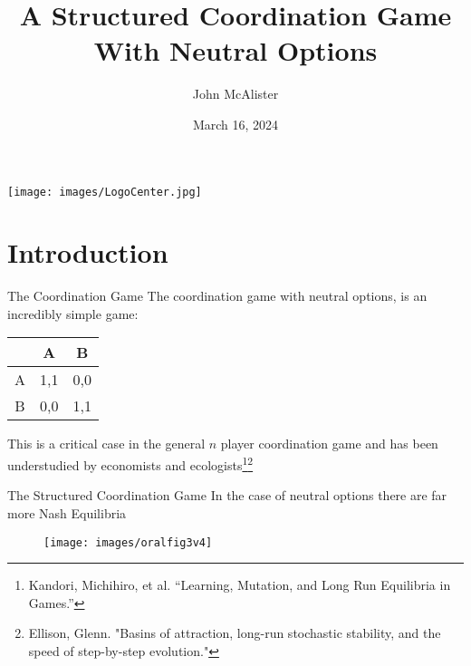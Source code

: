 \documentclass{beamer}
\title{A Structured Coordination Game With Neutral Options}
\author{John McAlister}
\institute[Fefferman Lab]{University of Tennessee - Knoxville}
\date{March 16, 2024}
\begin{document}
\begin{frame}[plain]
    \centering
    \maketitle
    \texttt{[image: images/LogoCenter.jpg]}
\end{frame}
\section{Introduction}
\begin{frame}{The Coordination Game}
	The coordination game with neutral options, is an incredibly simple game:
	\begin{center} 
		\begin{tabular}{c|cc}
			&A&B\\
			\hline 
			A&1,1&0,0\\
			B&0,0&1,1
		\end{tabular}
	\end{center}
	This is a critical case in the general $n$ player coordination game and has been understudied by economists and ecologists\footnote{Kandori, Michihiro, et al. “Learning, Mutation, and Long Run Equilibria in Games.”}\footnote{Ellison, Glenn. "Basins of attraction, long-run stochastic stability, and the speed of step-by-step evolution."}
	
\end{frame}

\begin{frame}{The Structured Coordination Game}
	In the case of neutral options there are far more Nash Equilibria
	\begin{figure}
		\texttt{[image: images/oralfig3v4]}
	\end{figure}
\end{frame}
\end{document}
